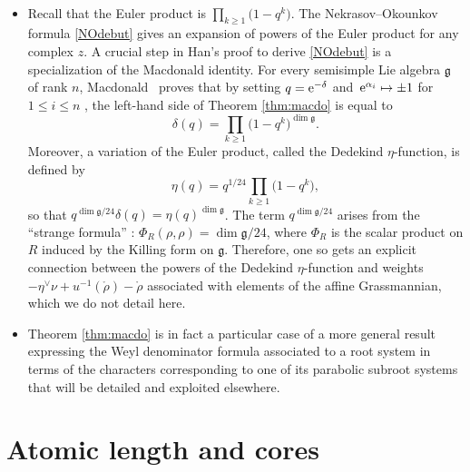 \documentclass[pdftex]{sigma}
\numberwithin{equation}{section}
\begin{document}
\begin{Remark}%
\
\begin{itemize}\itemsep=0pt
\item Recall that the Euler product is $\prod_{k\geq1} \bigl(
		1-q^{k}\bigr) $. The Nekrasov--Okounkov formula \eqref{NOdebut} gives an
		expansion of powers of the Euler product for any complex $z$. A crucial step in
		Han's proof to derive \eqref{NOdebut} is a specialization of the Macdonald
		identity. For every semisimple Lie algebra $\mathfrak{g}$ of rank $n$,
		Macdonald~\cite{Mac} proves that by setting $q={\rm e}^{-\delta}$ and~${{\rm e}^{\alpha
			_{i}}\mapsto\pm1}$ for~${1\leq i\leq n}$
		, the left-hand side of Theorem \ref{thm:macdo} is equal to
		\[
		\delta(q)=\prod_{k\geq1} \bigl( 1-q^{k}\bigr) ^{\dim\mathfrak{g}}.
		\]
		Moreover, a variation of the Euler product, called the Dedekind $\eta$-function,
		is defined by
		\[
		\eta(q)=q^{1/24}\prod_{k\geq1} \bigl( 1-q^{k}\bigr),
		\]
		so that $q^{\dim\mathfrak{g}/24}\delta(q)=\eta(q)^{\dim\mathfrak{g}}$. The
		term $q^{\dim\mathfrak{g}/24}$ arises from the ``strange formula'' \mbox{\cite[p.~243]{FVries}}:
        $\Phi_{R}(\rho,\rho)=\dim\mathfrak{g}/24$, where
		$\Phi_{R}$ is the scalar product on $R$ induced by the Killing form on
		$\mathfrak{g}$. Therefore, one so gets an explicit connection between the powers
		of the Dedekind $\eta$-function and weights $-\eta^{\vee}\nu+u^{-1}(\mathring
		{\rho})-\mathring{\rho}$ associated with elements of the affine Grassmannian,
		which we do not detail here.

\item Theorem \ref{thm:macdo} is in fact a particular case of a more general result expressing the Weyl denominator formula associated to a root system in terms of the characters corresponding to one of its parabolic subroot systems that will be detailed and exploited elsewhere.
\end{itemize}	
\end{Remark}

\section{Atomic length and cores}\label{sec:atomic}
\end{document}

